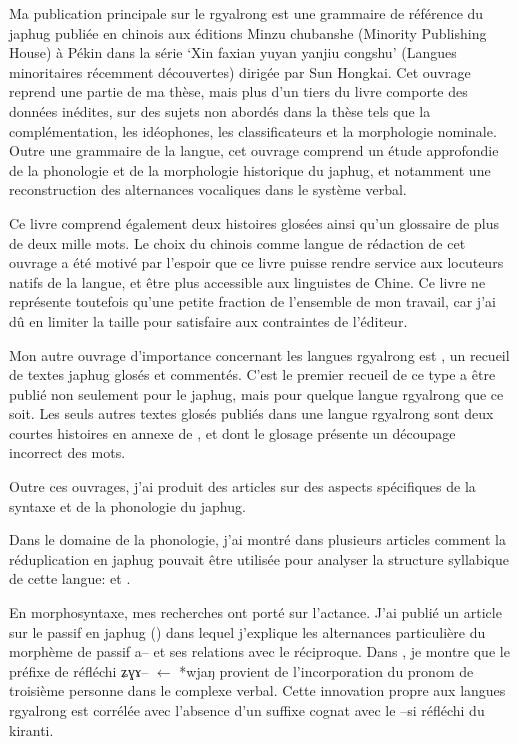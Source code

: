 \documentclass[oldfontcommands,oneside,a4paper,11pt]{memoir}
\newcommand{\ipa}[1]{{\phon #1}} %
\begin{document}
Ma publication principale sur le rgyalrong est \citet{jacques08} une grammaire de référence du japhug publiée en chinois aux éditions Minzu chubanshe (Minority Publishing House) à Pékin dans la série ‘Xin faxian yuyan yanjiu congshu’ (Langues minoritaires récemment découvertes) dirigée par Sun Hongkai. Cet ouvrage reprend une partie de ma thèse, mais plus d’un tiers du livre comporte des données inédites, sur des sujets non abordés dans la thèse tels que la complémentation, les idéophones, les classificateurs et la morphologie nominale. Outre une grammaire de la langue, cet ouvrage comprend un étude approfondie de la phonologie et de la morphologie historique du japhug, et notamment une reconstruction des alternances vocaliques dans le système verbal.


Ce livre comprend également deux histoires glosées ainsi qu’un glossaire de plus de deux mille mots. Le choix du chinois comme langue de rédaction de cet ouvrage a été motivé par l’espoir que ce livre puisse rendre service aux locuteurs natifs de la langue, et être plus accessible aux linguistes de Chine. Ce livre ne représente toutefois qu’une petite fraction de l’ensemble de mon travail, car j’ai dû en limiter la taille pour satisfaire aux contraintes de l’éditeur.

Mon autre ouvrage d'importance concernant les langues rgyalrong est \citet{jacques10gesar}, un recueil de textes japhug glosés et commentés. C'est le premier recueil de ce type a être publié non seulement pour le japhug, mais pour quelque langue rgyalrong que ce soit. Les seuls autres textes glosés publiés dans une langue rgyalrong sont deux courtes histoires en annexe de \citet{linxr93jiarong}, et dont le glosage  présente un découpage incorrect des mots.

Outre ces ouvrages, j’ai produit des articles sur des aspects spécifiques de la syntaxe et de la phonologie du japhug. 

	Dans le domaine de la phonologie, j’ai montré dans plusieurs articles comment la réduplication en japhug pouvait être utilisée pour analyser la structure syllabique de cette langue: \citet{jacques04redupl} et \citet{jacques07redupl}.
	
	
	En morphosyntaxe, mes recherches ont porté sur l’actance. J’ai publié un article sur le passif en japhug (\citealt{jacques07passif}) dans lequel j'explique les alternances particulière du morphème de passif a-- et ses relations avec le réciproque. Dans \citet{jacques10refl}, je montre que le préfixe de réfléchi \ipa{ʑɣɤ}-- $\leftarrow$ *wjaŋ provient de l'incorporation du pronom de troisième personne dans le complexe verbal. Cette innovation propre aux langues rgyalrong est corrélée avec l'absence d'un suffixe cognat avec le --\ipa{si} réfléchi du kiranti.
	
\end{document}
